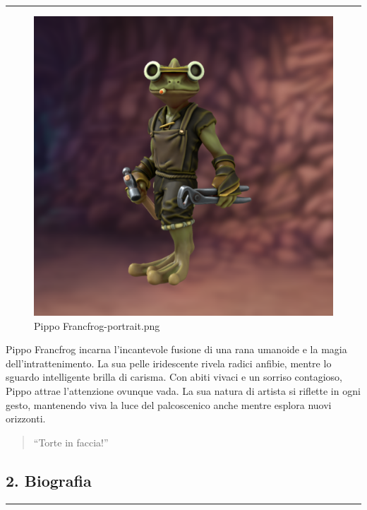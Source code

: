 \begin{center}\rule{0.5\linewidth}{0.5pt}\end{center}

\begin{figure}
\centering
\includegraphics{Pippo_Francfrog-portrait.png}
\caption{Pippo Francfrog-portrait.png}
\end{figure}

Pippo Francfrog incarna l'incantevole fusione di una rana umanoide e la
magia dell'intrattenimento. La sua pelle iridescente rivela radici
anfibie, mentre lo sguardo intelligente brilla di carisma. Con abiti
vivaci e un sorriso contagioso, Pippo attrae l'attenzione ovunque vada.
La sua natura di artista si riflette in ogni gesto, mantenendo viva la
luce del palcoscenico anche mentre esplora nuovi orizzonti.

\begin{quote}
``Torte in faccia!''
\end{quote}

\subsection{2. Biografia}\label{biografia}

\begin{center}\rule{0.5\linewidth}{0.5pt}\end{center}

